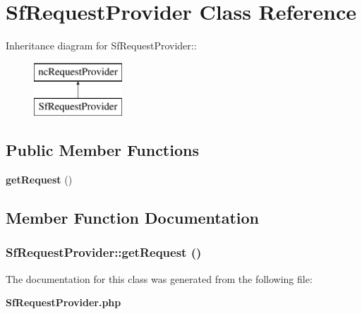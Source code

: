 \section{SfRequestProvider Class Reference}
\label{classSfRequestProvider}
Inheritance diagram for SfRequestProvider::\begin{figure}[H]
\begin{center}
\leavevmode
\includegraphics[height=2cm]{classSfRequestProvider}
\end{center}
\end{figure}
\subsection*{Public Member Functions}
\begin{CompactItemize}
\item 
{\bf getRequest} ()
\end{CompactItemize}


\subsection{Member Function Documentation}
\subsubsection{\setlength{\rightskip}{0pt plus 5cm}SfRequestProvider::getRequest ()}\label{classSfRequestProvider_e1694900e5ace5b350415af5157588f3}




The documentation for this class was generated from the following file:\begin{CompactItemize}
\item 
{\bf SfRequestProvider.php}\end{CompactItemize}
